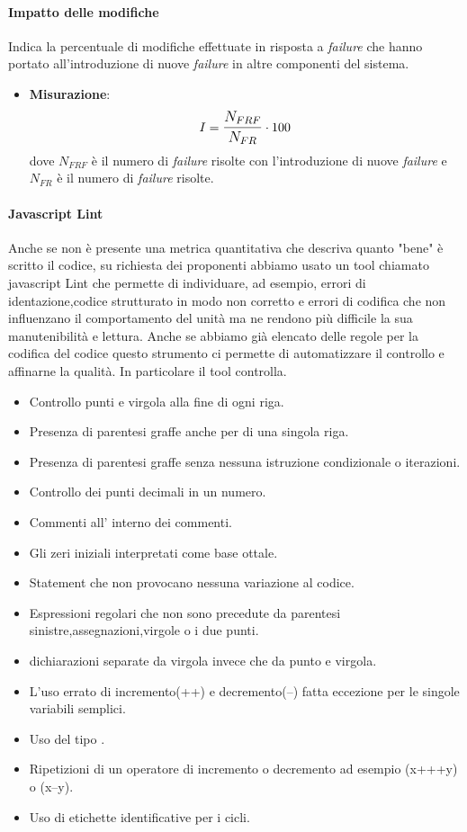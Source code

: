 \paragraph{Impatto delle modifiche}
Indica la percentuale di modifiche effettuate in risposta a \textit{failure} che hanno portato all'introduzione di nuove \textit{failure} in altre componenti del sistema.
\begin{itemize}
	\item \textbf{Misurazione}: 
		$$I=\mathlarger{\frac{N_{FRF}}{N_{FR}}} \cdot 100$$
	dove $N_{FRF}$ è il numero di \textit{failure} risolte con l'introduzione di nuove \textit{failure} e $N_{FR}$ è il numero di \textit{failure} risolte.
\end{itemize}


\paragraph{Javascript Lint}
Anche se non è presente una metrica quantitativa che descriva quanto "bene" è scritto il codice, su richiesta dei proponenti abbiamo usato un tool chiamato javascript Lint che permette di individuare, ad esempio, errori di identazione,codice strutturato in modo non corretto e errori di codifica che non influenzano il comportamento del unità ma ne rendono più difficile la sua manutenibilità e lettura.
Anche se abbiamo già elencato delle regole per la codifica del codice questo strumento ci permette di automatizzare il controllo e affinarne la qualità.
In particolare il tool  controlla.
\begin{itemize}
\item Controllo punti e virgola alla fine di ogni riga.
\item Presenza di parentesi graffe anche per  di una singola riga.
\item Presenza di parentesi graffe senza nessuna istruzione condizionale o iterazioni.
\item Controllo dei punti decimali in un numero.
\item Commenti all' interno dei commenti.
\item Gli zeri iniziali interpretati come base ottale. 
\item Statement che non provocano nessuna variazione al codice.
\item Espressioni regolari che non sono precedute da parentesi sinistre,assegnazioni,virgole o i due punti.
\item dichiarazioni separate da virgola invece che da punto e virgola.
\item L'uso errato di incremento(++) e decremento(--) fatta eccezione per le singole variabili semplici.
\item Uso del tipo .
\item Ripetizioni di un operatore di incremento o decremento ad esempio (x+++y) o (x--y).
\item Uso di etichette identificative per i cicli.
\end{itemize}

